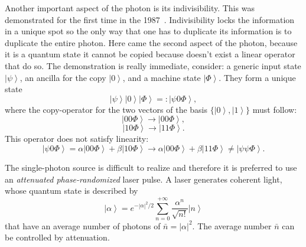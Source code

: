 Another important aspect of the photon is its indivisibility. This was demonstrated for the first time in the 1987~\cite{a23}. Indivisibility locks the information in a unique spot so the only way that one has to duplicate its information is to duplicate the entire photon. Here came the second aspect of the photon, because it is a quantum state it cannot be copied because doesn't exist a linear operator that do so. The demonstration is really immediate, consider: a generic input state $\left|\psi\right>$, an ancilla for the copy $\left|0\right>$, and a machine state $\left|\Phi\right>$. They form a unique state
\begin{equation}
  \left|\psi\right>\left|0\right>\left|\Phi\right> =: \left|\psi 0 \Phi\right>,
\end{equation}
where the copy-operator for the two vectors of the basis $\{\left|0\right>, \left|1\right>\}$ must follow:
\begin{equation}
  \left|0 0 \Phi\right> \to \left|0 0 \Phi\right>,
\end{equation}
\begin{equation}
  \left|1 0 \Phi\right> \to \left|1 1 \Phi\right>.
\end{equation}
This operator does not satisfy linearity:
\begin{equation}
  \left|\psi 0 \Phi\right> = \alpha\left|0 0 \Phi\right> + \beta\left|1 0 \Phi\right> \to \alpha\left|0 0 \Phi\right> + \beta\left|1 1 \Phi\right> \ne \left|\psi \psi \Phi\right>.
\end{equation}

The single-photon source is difficult to realize and therefore it is preferred to use an \textit{attenuated phase-randomized} laser pulse. A laser generates coherent light, whose quantum state is described by
\begin{equation}
  \left|\alpha\right> = e^{- |\alpha|^2 / 2} \sum_{n=0}^{+\infty} \frac{\alpha^n}{\sqrt{n!}} \left|n\right>
\end{equation}
that have an average number of photons of $\bar{n} = |\alpha|^2$. The average number $\bar{n}$ can be controlled by attenuation.


